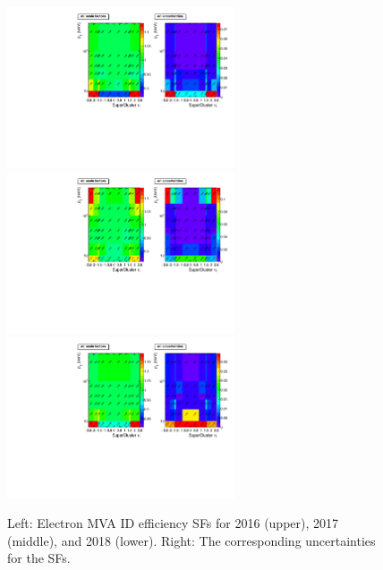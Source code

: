 \begin{figure}[tb]
	\begin{center}
		\includegraphics[width=0.6\textwidth]{fig/SFs/2016_ID_ele_2D.pdf}
		\includegraphics[width=0.6\textwidth]{fig/SFs/2017_ID_ele_2D.pdf}
		\includegraphics[width=0.6\textwidth]{fig/SFs/2018_ID_ele_2D.pdf}
	\end{center}
	\caption{Left: Electron MVA ID efficiency SFs for 2016 (upper), 2017 (middle), and 2018 (lower). Right: The corresponding uncertainties for the SFs.}
	\label{fig:electron_id_sf}
\end{figure}

\clearpage

